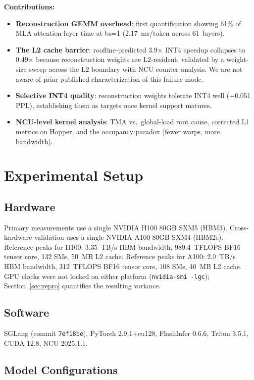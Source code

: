 \documentclass[10pt,twocolumn]{article}
\begin{document}
\textbf{Contributions:}
\begin{itemize}[leftmargin=*,topsep=0pt]
  \item \textbf{Reconstruction GEMM overhead}: first quantification showing 61\% of MLA attention-layer time at bs=1 (2.17~ms/token across 61~layers).
  \item \textbf{The L2 cache barrier}: roofline-predicted 3.9$\times$ INT4 speedup collapses to 0.49$\times$ because reconstruction weights are L2-resident, validated by a weight-size sweep across the L2 boundary with NCU counter analysis.  We are not aware of prior published characterization of this failure mode.
  \item \textbf{Selective INT4 quality}: reconstruction weights tolerate INT4 well (+0.051 PPL), establishing them as targets once kernel support matures.
  \item \textbf{NCU-level kernel analysis}: TMA vs.\ global-load root cause, corrected L1 metrics on Hopper, and the occupancy paradox (fewer warps, more bandwidth).
\end{itemize}

\section{Experimental Setup}

\subsection{Hardware}
Primary measurements use a single NVIDIA H100 80GB SXM5 (HBM3).  Cross-hardware validation uses a single NVIDIA A100 80GB SXM4 (HBM2e).  Reference peaks for H100: 3.35~TB/s HBM bandwidth, 989.4~TFLOPS BF16 tensor core, 132 SMs, 50~MB L2 cache.  Reference peaks for A100: 2.0~TB/s HBM bandwidth, 312~TFLOPS BF16 tensor core, 108 SMs, 40~MB L2 cache.  GPU clocks were not locked on either platform (\texttt{nvidia-smi -lgc}); Section~\ref{sec:repro} quantifies the resulting variance.

\subsection{Software}
SGLang (commit \texttt{7ef18be}), PyTorch 2.9.1+cu128, FlashInfer 0.6.6, Triton 3.5.1, CUDA 12.8, NCU 2025.1.1.

\subsection{Model Configurations}
\end{document}

